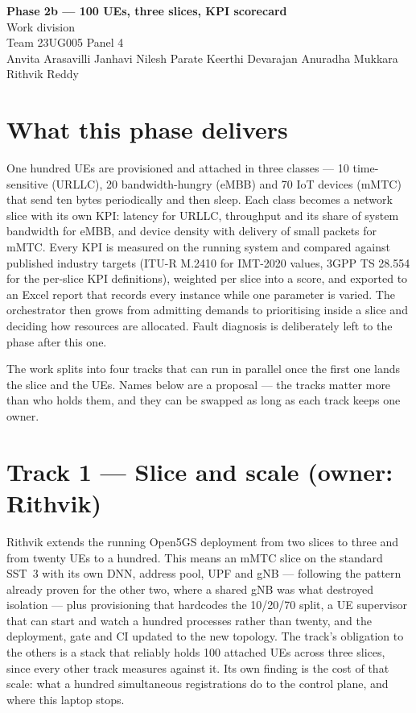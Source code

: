 \documentclass[11pt,a4paper]{article}
\begin{document}
\begin{center}
  {\Large\bfseries Phase 2b --- 100 UEs, three slices, KPI scorecard}\\[2mm]
  {\large Work division}\\[3mm]
  {\small Team 23UG005 \quad\textbullet\quad Panel 4}\\[1mm]
  {\small Anvita Arasavilli \quad Janhavi Nilesh Parate \quad Keerthi Devarajan Anuradha \quad Mukkara Rithvik Reddy}
\end{center}
\vspace{2mm}

\section*{What this phase delivers}

One hundred UEs are provisioned and attached in three classes --- 10 time-sensitive (URLLC),
20 bandwidth-hungry (eMBB) and 70 IoT devices (mMTC) that send ten bytes periodically and then
sleep. Each class becomes a network slice with its own KPI: latency for URLLC, throughput and its
share of system bandwidth for eMBB, and device density with delivery of small packets for mMTC.
Every KPI is measured on the running system and compared against published industry targets
(ITU-R M.2410 for IMT-2020 values, 3GPP TS 28.554 for the per-slice KPI definitions), weighted per
slice into a score, and exported to an Excel report that records every instance while one parameter
is varied. The orchestrator then grows from admitting demands to prioritising inside a slice and
deciding how resources are allocated. Fault diagnosis is deliberately left to the phase after this
one.

The work splits into four tracks that can run in parallel once the first one lands the slice and the
UEs. Names below are a proposal --- the tracks matter more than who holds them, and they can be
swapped as long as each track keeps one owner.

\section*{Track 1 --- Slice and scale (owner: Rithvik)}

Rithvik extends the running Open5GS deployment from two slices to three and from twenty UEs to a
hundred. This means an mMTC slice on the standard SST~3 with its own DNN, address pool, UPF and gNB
--- following the pattern already proven for the other two, where a shared gNB was what destroyed
isolation --- plus provisioning that hardcodes the 10/20/70 split, a UE supervisor that can start
and watch a hundred processes rather than twenty, and the deployment, gate and CI updated to the new
topology. The track's obligation to the others is a stack that reliably holds 100 attached UEs
across three slices, since every other track measures against it. Its own finding is the cost of
that scale: what a hundred simultaneous registrations do to the control plane, and where this laptop
stops.
\end{document}
